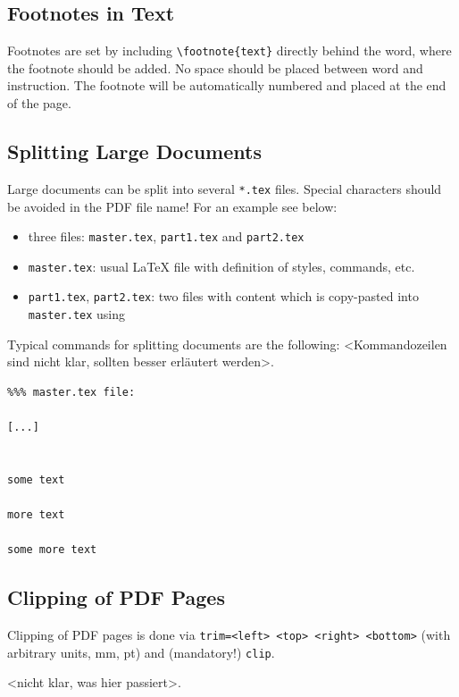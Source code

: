 \subsection{Footnotes in Text}
Footnotes are set by including \verb|\footnote{text}| directly behind the word, where the footnote
should be added. No space should be placed between word and instruction. The footnote will be
automatically numbered and placed at the end of the page.

\subsection{Splitting Large Documents}
Large documents can be split into several \verb|*.tex| files. Special characters should be avoided in the
PDF file name! For an example see below:
\begin{itemize}
\item three files: \verb|master.tex|, \verb|part1.tex| and \verb|part2.tex|
\item \verb|master.tex|: usual \LaTeX{} file with definition of styles, commands, etc.
\item \verb|part1.tex|, \verb|part2.tex|: two files with content which is copy-pasted into
\verb|master.tex| using \verb||
\end{itemize}

Typical commands for splitting documents are the following: <Kommandozeilen sind nicht klar, sollten
besser erläutert werden>.
\begin{minipage}{\linewidth}
\begin{verbatim}
%%% master.tex file:

[...]


some text

more text

some more text

\end{verbatim}
\end{minipage}

\subsection{Clipping of PDF Pages}
Clipping of PDF pages is done via \verb|trim=<left> <top> <right> <bottom>| (with arbitrary units, \eg
mm, pt) and (mandatory!) \verb|clip|.

<nicht klar, was hier passiert>.

